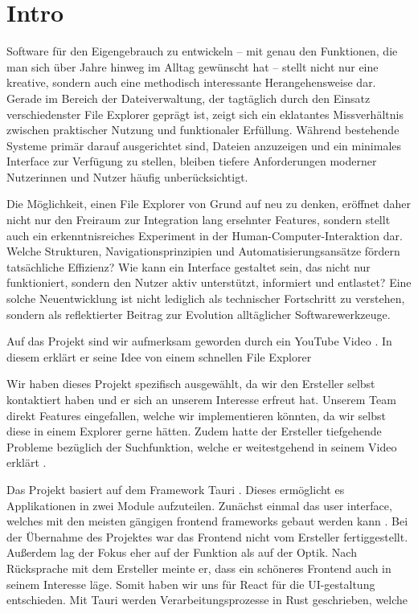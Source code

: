 \section{Intro} 
Software für den Eigengebrauch zu entwickeln – mit genau den Funktionen, die man sich über Jahre hinweg im Alltag
gewünscht hat – stellt nicht nur eine kreative, sondern auch eine methodisch interessante Herangehensweise dar. Gerade im Bereich
der Dateiverwaltung, der tagtäglich durch den Einsatz verschiedenster File Explorer geprägt ist, zeigt sich ein eklatantes
Missverhältnis zwischen praktischer Nutzung und funktionaler Erfüllung. Während bestehende Systeme primär darauf ausgerichtet
sind, Dateien anzuzeigen und ein minimales Interface zur Verfügung zu stellen, bleiben tiefere Anforderungen moderner Nutzerinnen
und Nutzer häufig unberücksichtigt.

Die Möglichkeit, einen File Explorer von Grund auf neu zu denken, eröffnet daher nicht nur den Freiraum zur Integration lang
ersehnter Features, sondern stellt auch ein erkenntnisreiches Experiment in der Human-Computer-Interaktion dar. Welche Strukturen,
Navigationsprinzipien und Automatisierungsansätze fördern tatsächliche Effizienz? Wie kann ein Interface gestaltet sein, das nicht
nur funktioniert, sondern den Nutzer aktiv unterstützt, informiert und entlastet? Eine solche Neuentwicklung ist nicht lediglich
als technischer Fortschritt zu verstehen, sondern als reflektierter Beitrag zur Evolution alltäglicher Softwarewerkzeuge.

Auf das Projekt sind wir aufmerksam geworden durch ein YouTube Video \cite{connaticus01}. In diesem erklärt er seine Idee von
einem schnellen File Explorer

Wir haben dieses Projekt spezifisch ausgewählt, da wir den Ersteller selbst kontaktiert haben und er sich an unserem Interesse
erfreut hat. Unserem Team direkt Features eingefallen, welche wir implementieren könnten, da wir selbst diese in einem Explorer
gerne hätten. Zudem hatte der Ersteller tiefgehende Probleme bezüglich der Suchfunktion, welche er weitestgehend in seinem Video
erklärt \cite{connaticus02}.

Das Projekt basiert auf dem Framework Tauri \cite{tauri2025}. Dieses ermöglicht es Applikationen in zwei Module aufzuteilen.
Zunächst einmal das user interface, welches mit den meisten gängigen frontend frameworks gebaut werden kann
\cite{tauri_frontends}. Bei der Übernahme des Projektes war das Frontend nicht vom Ersteller fertiggestellt. Außerdem lag der
Fokus eher auf der Funktion als auf der Optik. Nach Rücksprache mit dem Ersteller meinte er, dass ein schöneres Frontend auch in
seinem Interesse läge. Somit haben wir uns für React für die UI-gestaltung entschieden. 
Mit Tauri werden Verarbeitungsprozesse in Rust \cite{rust} geschrieben, welche 


